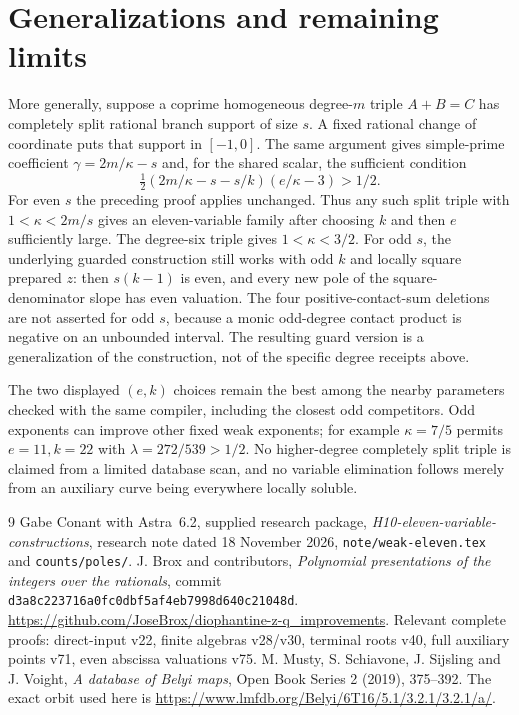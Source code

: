 \documentclass[11pt,a4paper]{article}
\begin{document}
\section{Generalizations and remaining limits}
More generally, suppose a coprime homogeneous degree-$m$ triple
$A+B=C$ has completely split rational branch support of size $s$.
A fixed rational change of coordinate puts that support in $[-1,0]$.
The same argument gives simple-prime coefficient $\gamma=2m/\kappa-s$
and, for the shared scalar, the sufficient condition
\[
 \tfrac12(2m/\kappa-s-s/k)(e/\kappa-3)>1/2.
\]
For even $s$ the preceding proof applies unchanged. Thus any such split
triple with $1<\kappa<2m/s$ gives an eleven-variable family after choosing
$k$ and then $e$ sufficiently large. The degree-six triple gives
$1<\kappa<3/2$.
For odd $s$, the underlying guarded construction still works with odd
$k$ and locally square prepared $z$: then $s(k-1)$ is even, and every
new pole of the square-denominator slope has even valuation. The four
positive-contact-sum deletions are not asserted for odd $s$, because a
monic odd-degree contact product is negative on an unbounded interval.
The resulting guard version is a generalization of the construction,
not of the specific degree receipts above.

The two displayed $(e,k)$ choices remain the best among the nearby
parameters checked with the same compiler, including the closest odd
competitors. Odd exponents can improve other fixed weak exponents; for
example $\kappa=7/5$ permits $e=11,k=22$ with
$\lambda=272/539>1/2$. No higher-degree completely split triple is claimed
from a limited database scan, and no variable elimination follows merely
from an auxiliary curve being everywhere locally soluble.

\begin{thebibliography}{9}
 Gabe Conant with Astra~6.2, supplied research package,
\emph{H10-eleven-variable-constructions}, research note dated 18 November
2026, \texttt{note/weak-eleven.tex} and \texttt{counts/poles/}.
 J. Brox and contributors,
\emph{Polynomial presentations of the integers over the rationals},
commit \texttt{d3a8c223716a0fc0dbf5af4eb7998d640c21048d}.
\url{https://github.com/JoseBrox/diophantine-z-q_improvements}.
Relevant complete proofs: direct-input v22, finite algebras v28/v30,
terminal roots v40, full auxiliary points v71, even abscissa valuations v75.
 M. Musty, S. Schiavone, J. Sijsling and J. Voight,
\emph{A database of Belyi maps}, Open Book Series 2 (2019), 375--392.
The exact orbit used here is
\url{https://www.lmfdb.org/Belyi/6T16/5.1/3.2.1/3.2.1/a/}.
\end{thebibliography}
\end{document}
